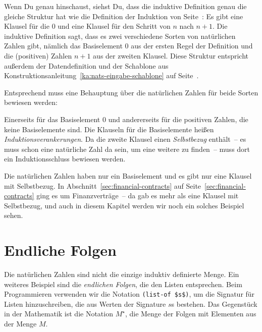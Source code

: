 Wenn Du genau hinschaust, siehst Du, dass die induktive Definition genau die
gleiche Struktur hat wie die Definition der Induktion von
Seite~\pageref{page:mathematical-induction}: Es gibt eine Klausel für
die $0$ und eine Klausel für den Schritt von $n$ nach $n+1$.  Die induktive
Definition sagt, dass es zwei verschiedene Sorten von natürlichen
Zahlen gibt, nämlich das Basiselement $0$ aus der ersten Regel der
Definition und die (positiven) Zahlen $n+1$ aus der zweiten Klausel.
Diese Struktur entspricht außerdem der Datendefinition und der Schablone aus
Konstruktionsanleitung~\ref{ka:nats-eingabe-schablone} auf
Seite~\pageref{ka:nats-eingabe-schablone}.

Entsprechend muss eine Behauptung über die natürlichen Zahlen für beide
Sorten bewiesen werden:

Einerseits für das Basiselement $0$ und
andererseits für die positiven Zahlen, die keine Basiselemente sind.
Die Klauseln für die Basiselemente heißen
\textit{Induktionsverankerungen}.  Da die
zweite Klausel einen \textit{Selbstbezug}
enthält~-- es muss schon eine natürliche Zahl da sein, um eine weitere
zu finden~-- muss dort ein Induktionsschluss bewiesen werden.

Die natürlichen Zahlen haben nur ein Basiselement und es gibt nur eine
Klausel mit Selbstbezug.  In Abschnitt~\ref{sec:financial-contracts} auf
Seite~\ref{sec:financial-contracts} ging es um Finanzverträge~-- da
gab es mehr als eine Klausel mit Selbstbezug, und auch in diesem
Kapitel werden wir noch ein solches Beispiel sehen.

\section{Endliche Folgen}
\label{sec:finite-sequences}

Die natürlichen Zahlen sind nicht die einzige induktiv definierte
Menge.  Ein weiteres Beispiel sind die \textit{endlichen Folgen}, die den Listen entsprechen.  Beim
Programmieren verwenden wir die Notation \lstinline{(list-of $s$)},
um die Signatur für Listen hinzuschreiben, die aus Werten
der Signature $s$s bestehen.  Das Gegenstück in der Mathematik ist die
Notation $M^\star$, die Menge der Folgen mit Elementen aus der Menge
$M$.

